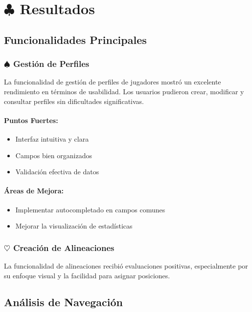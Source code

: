\documentclass[12pt,a4paper]{article}
\begin{document}
\section{$\clubsuit$ Resultados}

\subsection{Funcionalidades Principales}

\subsubsection{$\spadesuit$ Gestión de Perfiles}

La funcionalidad de gestión de perfiles de jugadores mostró un excelente rendimiento en términos de usabilidad. Los usuarios pudieron crear, modificar y consultar perfiles sin dificultades significativas.

\paragraph{Puntos Fuertes:}
\begin{itemize}
    \item Interfaz intuitiva y clara
    \item Campos bien organizados
    \item Validación efectiva de datos
\end{itemize}

\paragraph{Áreas de Mejora:}
\begin{itemize}
    \item Implementar autocompletado en campos comunes
    \item Mejorar la visualización de estadísticas
\end{itemize}

\subsubsection{$\heartsuit$ Creación de Alineaciones}

La funcionalidad de alineaciones recibió evaluaciones positivas, especialmente por su enfoque visual y la facilidad para asignar posiciones.

\subsection{Análisis de Navegación}
\end{document}
